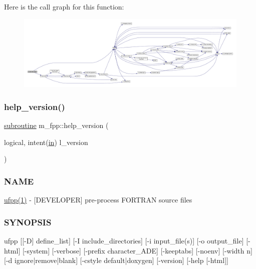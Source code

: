 Here is the call graph for this function\+:
\nopagebreak
\begin{figure}[H]
\begin{center}
\leavevmode
\includegraphics[width=350pt]{namespacem__fpp_a17c5179799e6700fe39fb3bd2ec85d01_cgraph}
\end{center}
\end{figure}
\mbox{\label{namespacem__fpp_a7a571f61ee26c2a637c1530d2271ab23}} 
\subsubsection{\texorpdfstring{help\+\_\+version()}{help\_version()}}
{\footnotesize\ttfamily \hyperlink{M__stopwatch_83_8txt_acfbcff50169d691ff02d4a123ed70482}{subroutine} m\+\_\+fpp\+::help\+\_\+version (\begin{DoxyParamCaption}\item[{logical, intent(\hyperlink{M__journal_83_8txt_afce72651d1eed785a2132bee863b2f38}{in})}]{l\+\_\+version }\end{DoxyParamCaption})}



\subsubsection*{N\+A\+ME}

\hyperlink{ufpp__overview_81_8txt_a97c20a96bcab81bc74c9d64b001f1202}{ufpp(1)} -\/ \mbox{[}D\+E\+V\+E\+L\+O\+P\+ER\mbox{]} pre-\/process F\+O\+R\+T\+R\+AN source files 

\subsubsection*{S\+Y\+N\+O\+P\+S\+IS}

\begin{DoxyVerb}ufpp  [[-D] define_list]
      [-I include_directories]
      [-i input_file(s)]
      [-o output_file]
      [-html]
      [-system]
      [-verbose]
      [-prefix character_ADE]
      [-keeptabs]
      [-noenv]
      [-width n]
      [-d ignore|remove|blank]
      [-cstyle default|doxygen]
      [-version]
      [-help [-html]]
\end{DoxyVerb}

